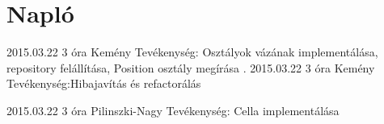 %
\section{Napló}

\begin{naplo}

\bejegyzes
{2015.03.22}
{3 óra}
{Kemény}
{Tevékenység: Osztályok vázának implementálása, repository felállítása, Position osztály megírása .}
\bejegyzes
{2015.03.22}
{3 óra}
{Kemény}
{Tevékenység:Hibajavítás és refactorálás}

\bejegyzes
{2015.03.22}
{3 óra}
{Pilinszki-Nagy}
{Tevékenység: Cella implementálása}


\end{naplo}

